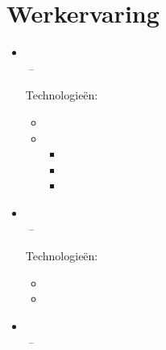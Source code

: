 \documentclass[11pt,a4paper]{article}
\begin{document}
\section{Werkervaring}
\begin{itemize}[leftmargin=0pt,label={},itemsep=2em,topsep=0pt]
\item \parbox{\textwidth}{\textbf{\KhonraadNameNL} \hfill \textit{\KhonraadLocationNL}}\\
\textit{\KhonraadThirdJobTitleNL} \hfill \textit{\KhonraadFirstJobStartNL\,--\,\KhonraadThirdJobEndNL}

\vspace{0.2cm}
{\color{secondary}Technologieën:} \KhonraadTechnologyNL
\vspace{0.3cm}
\begin{itemize}[leftmargin=*,topsep=-6pt,parsep=0pt,partopsep=0pt,itemsep=0pt]
    \item \KhonraadJavaNL
    \item \KhonraadInnovationNL
    \begin{itemize}[leftmargin=*,topsep=0pt,parsep=0pt,partopsep=0pt,itemsep=0pt,label={--}]
        \item \KhonraadMobileNL
        \item \KhonraadAndroidNL
        \item \KhonraadMPSNL
    \end{itemize}
\end{itemize} 


\item \parbox{\textwidth}{\textbf{\McfunshineNameNL} \hfill \textit{\McfunshineLocationNL}}\\
\textit{\McfunshineJobTitleNL} \hfill \textit{\McfunshineJobStartNL\,--\,\McfunshineJobEndNL}

\vspace{0.2cm}
{\color{secondary}Technologieën:} \McfunshinePodmorphTechnologyNL
\vspace{0.3cm}
\begin{itemize}[leftmargin=*,topsep=-6pt,parsep=0pt,partopsep=0pt,itemsep=0pt]
    \item \McfunshinePodmorphNL
    \item \McfunshinePodmorphAINL
\end{itemize}


\item \parbox{\textwidth}{\textbf{\BakerNameNL} \hfill \textit{\BakerLocationNL}}\\
\textit{\BakerFirstJobTitleNL} \hfill \textit{\BakerFirstJobStartNL\,--\,\BakerSecondJobEndNL}


\end{itemize}
\end{document}
